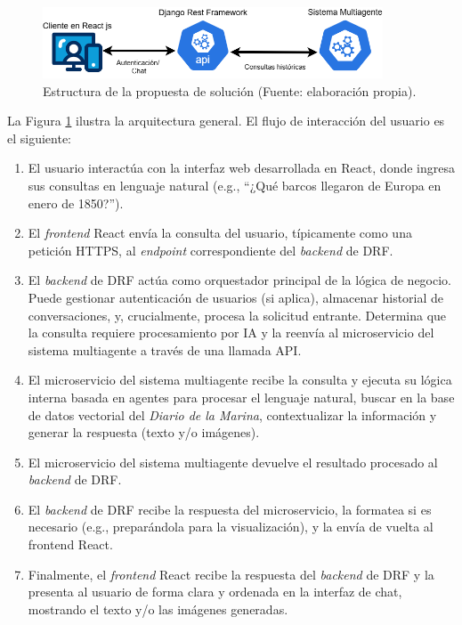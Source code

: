 \begin{figure}[htbp] %
	\centering
	\includegraphics[width=0.9\textwidth]{images/micro.png} 
	\caption{Estructura de la propuesta de solución (Fuente: elaboración propia).}
	\label{fig:arquitectura_web}
\end{figure}

La Figura \ref{fig:arquitectura_web} ilustra la arquitectura general. El flujo de interacción del usuario es el siguiente:

\begin{enumerate}
	\item El usuario interactúa con la interfaz web desarrollada en React, donde ingresa sus consultas en lenguaje natural (e.g., “¿Qué barcos llegaron de Europa en enero de 1850?”).
	\item El \textit{frontend} React envía la consulta del usuario, típicamente como una petición HTTPS, al \textit{endpoint} correspondiente del \textit{backend} de DRF.
	\item El \textit{backend} de DRF actúa como orquestador principal de la lógica de negocio. Puede gestionar autenticación de usuarios (si aplica), almacenar historial de conversaciones, y, crucialmente, procesa la solicitud entrante. Determina que la consulta requiere procesamiento por IA y la reenvía al microservicio del sistema multiagente a través de una llamada API.
	\item El microservicio del sistema multiagente recibe la consulta y ejecuta su lógica interna basada en agentes para procesar el lenguaje natural, buscar en la base de datos vectorial del \textit{Diario de la Marina}, contextualizar la información y generar la respuesta (texto y/o imágenes).
	\item El microservicio del sistema multiagente devuelve el resultado procesado al \textit{backend} de DRF.
	\item El \textit{backend} de DRF recibe la respuesta del microservicio, la formatea si es necesario (e.g., preparándola para la visualización), y la envía de vuelta al frontend React.
	\item Finalmente, el \textit{frontend} React recibe la respuesta del \textit{backend} de DRF y la presenta al usuario de forma clara y ordenada en la interfaz de chat, mostrando el texto y/o las imágenes generadas.
\end{enumerate}

